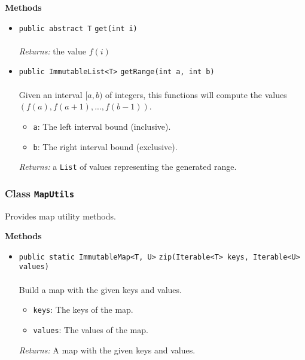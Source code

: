 \textbf{\sffamily Methods}
\begin{itemize}
\item \lstinline|public abstract T| \lstinline|get|\lstinline|(int i)|\\ \\[-0.6em]
\emph{Returns:} the value $f(i)$



\item \lstinline|public ImmutableList<T>| \lstinline|getRange|\lstinline|(int a, int b)|\\ \\[-0.6em]
Given an interval $[a, b)$ of integers, this functions will compute the
 values $(f(a), f(a + 1), ..., f(b - 1))$.
\begin{itemize}
\item \lstinline|a|: The left interval bound (inclusive).
\item \lstinline|b|: The right interval bound (exclusive).
\end{itemize}

\emph{Returns:} a \lstinline|List| of values representing the generated range.

\end{itemize}

\subsubsection{Class \lstinline|MapUtils|}
Provides map utility methods. \\
\noindent\begin{minipage}[t]{5cm}
\vspace{0.3em}
\hspace*{2em}
\vspace{0.3em}
\end{minipage}





\textbf{\sffamily Methods}
\begin{itemize}
\item \lstinline|public static ImmutableMap<T, U>| \lstinline|zip|\lstinline|(Iterable<T> keys, Iterable<U> values)|\\ \\[-0.6em]
Build a map with the given keys and values.
\begin{itemize}
\item \lstinline|keys|: The keys of the map.
\item \lstinline|values|: The values of the map.
\end{itemize}

\emph{Returns:} A map with the given keys and values.

\end{itemize}

